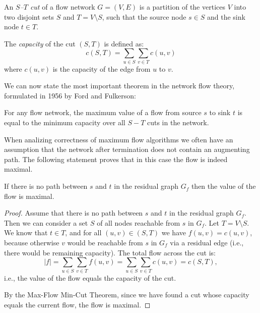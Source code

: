 \begin{defn}
An \emph{$S$–$T$ cut} of a flow network $G = (V, E)$ is a partition of the vertices $V$ into two disjoint sets $S$ and $T = V \setminus S$, such that the source node $s \in S$ and the sink node $t \in T$.

The \emph{capacity} of the cut $(S, T)$ is defined as:
$$
c(S, T) = \sum_{u \in S} \sum_{v \in T} c(u, v)
$$
where $c(u, v)$ is the capacity of the edge from $u$ to $v$.
\end{defn}
We can now state the most important theorem in the network flow theory, formulated in 1956 by Ford and Fulkerson: 
\begin{theorem}
For any flow network, the maximum value of a flow from source $s$ to sink $t$ is equal to the minimum capacity over all $S-T$ cuts in the network.
\end{theorem}

When analizing correctness of maximum flow algorithms we often have an assumption that the network after termination does not contain an augmenting path. The following statement proves that in this case the flow is indeed maximal.

\begin{theorem}\label{thm:max}
If there is no path between $s$ and $t$ in the residual graph $G_f$ then the value of the flow is maximal.
\end{theorem}

\begin{proof}
Assume that there is no path between $s$ and $t$ in the residual graph $G_f$. Then we can consider a set $S$
of all nodes reachable from $s$ in $G_f$. Let $T = V \setminus S$. We know that $t \in T$, and for all $(u,v) \in (S,T)$ we have $f(u,v) = c(u,v)$, because otherwise $v$ would be reachable from $s$ in $G_f$ via a residual edge (i.e., there would be remaining capacity). The total flow across the cut is:
$$
|f| = \sum_{u \in S} \sum_{v \in T} f(u,v) = \sum_{u \in S} \sum_{v \in T} c(u,v) = c(S,T),
$$
i.e., the value of the flow equals the capacity of the cut.

By the Max-Flow Min-Cut Theorem, since we have found a cut whose capacity equals the current flow, the flow is maximal.
\end{proof}
